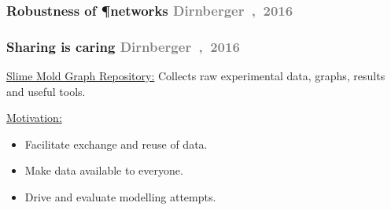 \documentclass[	hyperref={pdfpagelabels=false}, xcolor=dvipsnames,
		11pt]{beamer}
\begin{document}
\begin{frame}
    \frametitle{Robustness of \P networks \tiny{\textcolor{gray}{Dirnberger~\etal,~2016}}} 
   
	\begin{figure}[h]
		 \captionsetup[subfloat]{position=bottom,labelformat=empty,font=scriptsize}
	     \begin{center}
	     \end{center}
	\end{figure}
\end{frame}

\begin{frame}
    \frametitle{Sharing is caring \tiny{\textcolor{gray}{Dirnberger~\etal,~2016}}} 

    \begin{block}{\underline{Slime Mold Graph Repository:}}
    	Collects  raw experimental data, graphs, results and useful tools.
    \end{block}

	\begin{alertblock}{\underline{Motivation:}}
	 \begin{itemize}
		   \item Facilitate exchange and reuse of data.
		   \item Make data available to everyone.
		   \item Drive and evaluate modelling attempts.
	 \end{itemize}
	\end{alertblock}
\end{frame}
\end{document}
